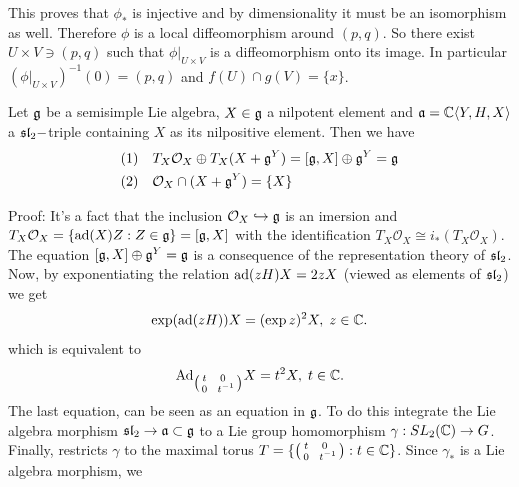 This proves that $\phi_*$ is injective and by dimensionality it must be an isomorphism as well. Therefore $\phi$ is a 
local diffeomorphism around $(p,q)$. So there exist $U\times V\ni (p,q)$ such that $\phi|_{U\times V}$ is a diffeomorphism onto its image. 
In particular $(\phi|_{U\times V})^{-1}(0)=(p,q)$ and $f(U)\cap g(V)=\{x\}$.

\begin{dang}
    \begin{theorem}
        Let $\mathfrak{g}$ be a semisimple Lie algebra, $X\in\mathfrak{g}$ a nilpotent element and 
        $\mathfrak{a}=\mathbb{C}\langle Y,H,X\rangle$ a $\mathfrak{sl}_2-$triple containing $X$ as its nilpositive element. Then we have 
        \begin{equation}
            \begin{aligned}
             &(1)\quad  T_X\mathcal{O}_X \oplus T_X(X+\mathfrak{g}^Y)= [\mathfrak{g},X]\oplus\mathfrak{g}^Y = \mathfrak{g}\\
             &(2)\quad  \mathcal{O}_X\cap(X+\mathfrak{g}^Y)=\{X\}
            \end{aligned}          
        \end{equation}
    \end{theorem}
\end{dang}
Proof: It's a fact that the inclusion $\mathcal{O}_X\hookrightarrow\mathfrak{g}$ is an imersion and 
$T_X\mathcal{O}_X=\{\text{ad}(X)Z:Z\in\mathfrak{g}\}=[\mathfrak{g},X]$ with the identification $T_X\mathcal{O}_X\cong i_*(T_X\mathcal{O}_X)$. The 
equation $[\mathfrak{g},X]\oplus\mathfrak{g}^Y = \mathfrak{g}$ is a consequence of the representation theory of $\mathfrak{sl}_2$. Now, by exponentiating the relation  
$\text{ad}(zH)X=2zX$ (viewed as elements of $\mathfrak{sl}_2$) we get 
\begin{equation}
   \exp(\text{ad}(zH))X=(\exp z)^2X,\;z\in\mathbb{C}.
\end{equation}
which is equivalent to 
\begin{equation}
    \text{Ad}_{\left(\begin{smallmatrix}t&0\\0&\;\;t^{-1}\end{smallmatrix}\right)}X=t^2X,\;t\in\mathbb{C}.
\end{equation}
The last equation, can be seen as an equation in $\mathfrak{g}$. To do this integrate the Lie algebra morphism $\mathfrak{sl}_2\to\mathfrak{a}\subset \mathfrak{g}$ to 
a Lie group homomorphism $\gamma:SL_2(\mathbb{C})\to G$. Finally, restricts $\gamma$ to the maximal torus 
$T=\{\left(\begin{smallmatrix}t&0\\0&\;\;t^{-1}\end{smallmatrix}\right):t\in\mathbb{C}\}$. Since $\gamma_*$ is a Lie algebra morphism, we 
